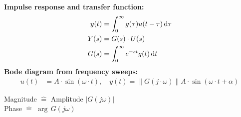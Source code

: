 \begin{tcolorbox}[colback=brown!5!white,colframe=brown!75!black,title=\textbf{Nonparametric and Frequency Domain Identification Models}]
\textbf{Impulse response and transfer function:}
\begin{align*}
	y(t) &= \int_{0}^{\infty} g(\tau) u(t-\tau) \, \mathrm{d} \tau \\
	Y(s) &= G(s)\cdot U(s) \\
	G(s) &= \int_{0}^{\infty} e^{-st} g(t) \, \mathrm{d} t 
\end{align*}
\textbf{Bode diagram from frequency sweeps:}
\begin{align*}
	u(t) &= A \cdot \sin(\omega \cdot t),\quad y(t) = \lVert G (j\cdot \omega )\rVert A \cdot \sin(\omega \cdot t + \alpha)
\end{align*}
\end{tcolorbox}

\begin{tcolorbox}[colback=brown!5!white,colframe=brown!75!black,title=\textbf{Bode Diagramm}]
	Magnitude $\widehat{=}$ Amplitude $|G(j\omega)|$\\
	Phase $\widehat{=}$ $\arg \, G(j\omega)$
\end{tcolorbox}



